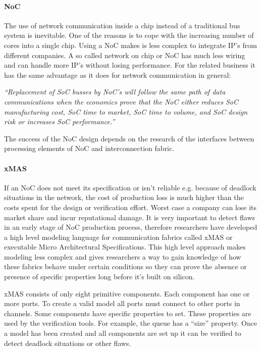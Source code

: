 \paragraph{NoC}

The use of network communication inside a chip instead of a traditional bus
system is inevitable. One of the reasons is to cope with the increasing number
of cores into a single chip. Using a NoC makes is less complex to integrate IP's from
different companies. A so called network on chip or NoC has much less wiring
\cite{NoC-busses} and can handle more IP's without losing performance. For the
related business it has the same advantage as it does for network communication
in general:

\textit{``Replacement of SoC busses by NoC's will follow the same path of data
communications when the economics prove that the NoC either reduces SoC
manufacturing cost, SoC time to market, SoC time to volume, and SoC design risk
or increases SoC performance.''} \cite{NoC-busses} 

The success of the NoC design depends on the research of the interfaces between
processing elements of NoC and interconnection fabric.

\paragraph{xMAS}

If an NoC does not meet its specification or isn't reliable e.g. because of
deadlock situations in the network, the cost of production loss is much higher
than the costs spent for the design or verification effort. Worst case a
company can lose its market share and incur reputational damage.
It is very important to detect flaws in an early stage of NoC production
process, therefore researchers have developed a high level modeling language for
communication fabrics called xMAS or executable Micro Architectural
Specifications. This high level approach makes modeling less complex and gives
researchers a way to gain knowledge of how these fabrics behave under certain
conditions so they can prove the absence or presence of specific properties long
before it's built on silicon.

xMAS consists of only eight primitive components. Each component has one or more
ports. To create a valid model all ports must connect to other ports in channels. Some
components have specific properties to set. These properties are used by the
verification tools. For example, the queue has a ``size'' property. Once a model
has been created and all components are set up it can be verified to detect
deadlock situations or other flaws.

